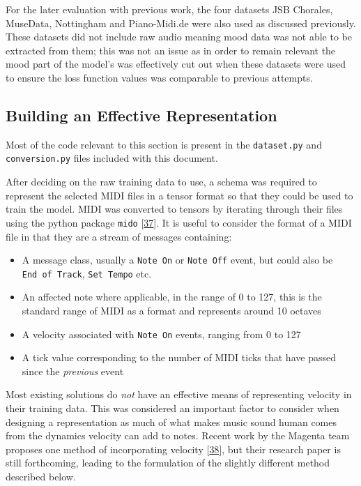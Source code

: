 \documentclass[12pt,]{article}
\providecommand{\tightlist}{%
  \setlength{\itemsep}{0pt}\setlength{\parskip}{0pt}}
\begin{document}
For the later evaluation with previous work, the four datasets JSB
Chorales, MuseData, Nottingham and Piano-Midi.de were also used as
discussed previously. These datasets did not include raw audio meaning
mood data was not able to be extracted from them; this was not an issue
as in order to remain relevant the mood part of the model's was
effectively cut out when these datasets were used to ensure the loss
function values was comparable to previous attempts.

\hypertarget{building-an-effective-representation}{%
\subsection{Building an Effective
Representation}\label{building-an-effective-representation}}

Most of the code relevant to this section is present in the
\texttt{dataset.py} and \texttt{conversion.py} files included with this
document.

After deciding on the raw training data to use, a schema was required to
represent the selected MIDI files in a tensor format so that they could
be used to train the model. MIDI was converted to tensors by iterating
through their files using the python package \texttt{mido}
{[}\protect\hyperlink{ref-mido}{37}{]}. It is useful to consider the
format of a MIDI file in that they are a stream of messages containing:

\begin{itemize}
\tightlist
\item
  A message class, usually a \texttt{Note\ On} or \texttt{Note\ Off}
  event, but could also be \texttt{End\ of\ Track}, \texttt{Set\ Tempo}
  etc.
\item
  An affected note where applicable, in the range of 0 to 127, this is
  the standard range of MIDI as a format and represents around 10
  octaves
\item
  A velocity associated with \texttt{Note\ On} events, ranging from 0 to
  127
\item
  A tick value corresponding to the number of MIDI ticks that have
  passed since the \emph{previous} event
\end{itemize}

Most existing solutions do \emph{not} have an effective means of
representing velocity in their training data. This was considered an
important factor to consider when designing a representation as much of
what makes music sound human comes from the dynamics velocity can add to
notes. Recent work by the Magenta team proposes one method of
incorporating velocity
{[}\protect\hyperlink{ref-performance-rnn-2017}{38}{]}, but their
research paper is still forthcoming, leading to the formulation of the
slightly different method described below.
\end{document}
